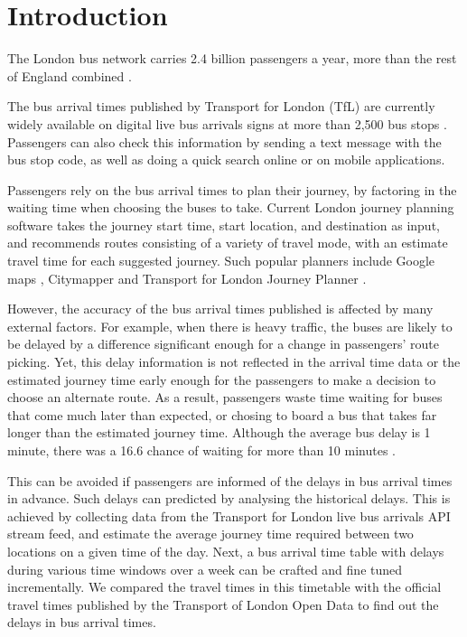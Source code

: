 \chapter{Introduction}

The London bus network carries 2.4 billion passengers a year, more than the rest of England combined \cite{tfl_annual_report_13/14}.

\par The bus arrival times published by Transport for London (TfL) are currently widely available on digital live bus arrivals signs at more than 2,500 bus stops \cite{live_bus_arrivals}. Passengers can also check this information by sending a text message with the bus stop code, as well as doing a quick search online or on mobile applications.

\par Passengers rely on the bus arrival times to plan their journey, by factoring in the waiting time when choosing the buses to take. Current London journey planning software takes the journey start time, start location, and destination as input, and recommends routes consisting of a variety of travel mode, with an estimate travel time for each suggested journey. Such popular planners include Google maps \cite{google_maps}, Citymapper \cite{citymapper} and Transport for London Journey Planner \cite{tfl_journey_planner}.

\par However, the accuracy of the bus arrival times published is affected by many external factors. For example, when there is heavy traffic, the buses are likely to be delayed by a difference significant enough for a change in passengers' route picking. Yet, this delay information is not reflected in the arrival time data or the estimated journey time early enough for the passengers to make a decision to choose an alternate route. As a result, passengers waste time waiting for buses that come much later than expected, or chosing to board a bus that takes far longer than the estimated journey time. Although the average bus delay is 1 minute, there was a 16.6 chance of waiting for more than 10 minutes \cite{buses_performance_data}.

\par This can be avoided if passengers are informed of the delays in bus arrival times in advance. Such delays can predicted by analysing the historical delays. This is achieved by collecting data from the Transport for London live bus arrivals API stream feed\cite{live_bus_arrivals}, and estimate the average journey time required between two locations on a given time of the day. Next, a bus arrival time table with delays during various time windows over a week can be crafted and fine tuned incrementally. We compared the travel times in this timetable with the official travel times published by the Transport of London Open Data to find out the delays in bus arrival times.